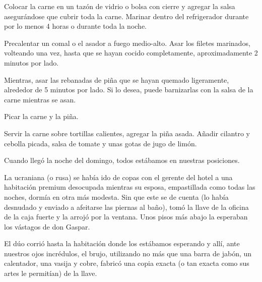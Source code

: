 \documentclass[12pt,twoside,openright,a5paper]{book}
\begin{document}
\vspace{0.5cm}

\hrulefill\hspace{0.2cm} \decofourleft\decofourright \hspace{0.2cm} \hrulefill
\vspace{0.5cm}

Colocar la carne en un tazón de vidrio o bolsa con cierre y agregar la
salsa asegurándose que cubrir toda la carne. Marinar dentro del refrigerador
durante por lo menos 4 horas o durante toda la noche.

Precalentar un comal o el asador a fuego medio-alto. Asar los filetes
marinados, volteando una vez, hasta que se hayan cocido completamente,
aproximadamente 2 minutos por lado.

Mientras, asar las rebanadas de piña que se hayan quemado ligeramente,
alrededor de 5 minutos por lado. Si lo desea, puede barnizarlas con la
salsa de la carne mientras se asan.

Picar la carne y la piña.

Servir la carne sobre tortillas calientes, agregar la piña asada. Añadir
cilantro y cebolla picada, salsa de tomate y unas gotas de jugo de limón.

\vspace{0.5cm}

\hrulefill\hspace{0.2cm} \decofourleft\decofourright \hspace{0.2cm} \hrulefill
\vspace{0.5cm}

Cuando llegó la noche del domingo, todos estábamos en nuestras posiciones.

La ucraniana (o rusa) se había ido de copas con el gerente del hotel
a una habitación premium desocupada mientras su esposa, empastillada como
todas las noches, dormía en otra más modesta. Sin que este se de cuenta
(lo había desnudado y enviado a afeitarse las piernas al baño), tomó
la llave de la oficina de la caja fuerte y la arrojó por la ventana. Unos
pisos más abajo la esperaban los vástagos de don Gaspar.

El dúo corrió hasta la habitación donde los estábamos esperando y allí,
ante nuestros ojos incrédulos, el brujo, utilizando no más que una barra
de jabón, un calentador, una vasija y cobre, fabricó una copia exacta
(o tan exacta como sus artes le permitían) de la llave.
\end{document}
